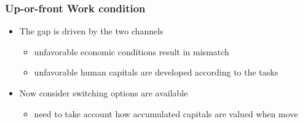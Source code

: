 \documentclass[11pt]{beamer}
\begin{document}
\begin{frame}
	\frametitle{Up-or-front Work condition}
	\begin{itemize}
		\begin{block}<1->{Assumption 3. Job switching is prohibited over the few years}
			Economists work under up-or-front policy	
		\end{block}
		\begin{block}<1->{Corollary 1. Short-run hysteresis}
			If $u_t < u_{t'}$, then $\mathop{{}\mathbb{E}}_{i} \left[Y_{ifot}^1 \mid u_t, X_i \right] > \mathop{{}\mathbb{E}}_{i} \left[Y_{ifot}^1 \mid u_{t'}, X_i \right]$
		\end{block}	
		\item The gap is driven by the two channels
		\begin{itemize}
			\item unfavorable economic conditions result in mismatch 
			\item unfavorable human capitals are developed according to the tasks 
		\end{itemize}
		\item Now consider switching options are available
		\begin{itemize}
			\item need to take account how accumulated capitals are valued when move
		\end{itemize}
	\end{itemize}
\end{frame}



%
%			
\end{document}
